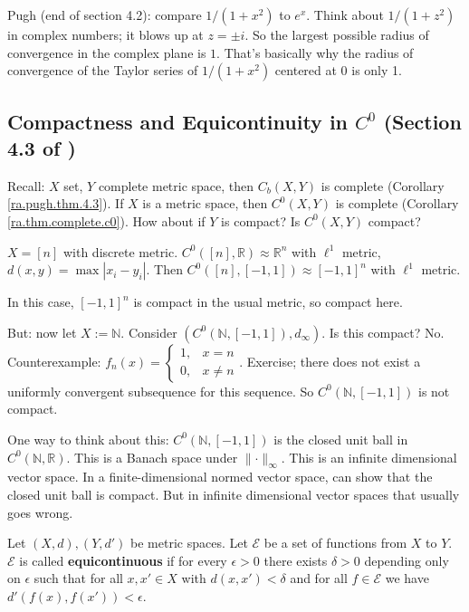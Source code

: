 Pugh (end of section 4.2): compare \(1/(1+x^2)\) to \(e^x\). Think about \(1/(1+z^2)\) in complex numbers; it blows up at \(z = \pm i\). So the largest possible radius of convergence in the complex plane is \(1\). That's basically why the radius of convergence of the Taylor series of \(1/(1+x^2)\) centered at 0 is only 1. 

\subsection{Compactness and Equicontinuity in \(C^0\) (Section 4.3 of \citet{pugh2015real})}

Recall: \(X\) set, \(Y\) complete metric space, then \(C_b(X,Y)\) is complete (Corollary \ref{ra.pugh.thm.4.3}). If \(X\) is a metric space, then \(C^0(X,Y)\) is complete (Corollary \ref{ra.thm.complete.c0}). How about if \(Y\) is compact? Is \(C^0(X,Y)\) compact?

\begin{example}

\(X = [n]\) with discrete metric. \(C^0([n], \mathbb{R}) \approx  \mathbb{R}^n\) with \(\ell^1\) metric, \(d(x,y) = \max|x_i - y_i|\). Then \(C^0([n], [-1,1]) \approx [-1, 1]^n\) with \(\ell^1\) metric.

In this case, \([-1,1]^n\) is compact in the usual metric, so compact here.

But: now let \(X := \mathbb{N}\). Consider \((C^0(\mathbb{N}, [-1,1]), d_\infty)\). Is this compact? No. Counterexample: \(f_n(x) = \begin{cases}1, & x =n \\ 0, & x \neq n\end{cases}\). Exercise; there does not exist a uniformly convergent subsequence for this sequence. So \(C^0(\mathbb{N}, [-1,1])\) is not compact. 

\end{example}

One way to think about this: \(C^0(\mathbb{N}, [-1,1])\) is the closed unit ball in \(C^0(\mathbb{N}, \mathbb{R})\). This is a Banach space under \(\lVert \cdot \rVert_\infty\). This is an infinite dimensional vector space. In a finite-dimensional normed vector space, can show that the closed unit ball is compact. But in infinite dimensional vector spaces that usually goes wrong. 

\begin{definition}

Let \((X, d), (Y, d')\) be metric spaces. Let \(\mathcal{E}\) be a set of functions from \(X\) to \(Y\). \(\mathcal{E}\) is called \textbf{equicontinuous} if for every \(\epsilon > 0\) there exists \(\delta > 0\) depending only on \(\epsilon\) such that for all \(x, x' \in X\) with \(d(x, x') < \delta\) and for all \(f \in \mathcal{E}\) we have \(d'(f(x), f(x')) < \epsilon\). 

\end{definition}

